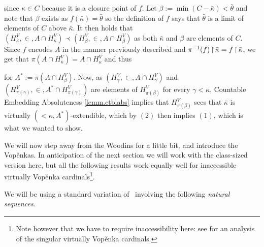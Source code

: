 \documentclass[../../main]{subfiles}
\begin{document}
{  since $\kappa\in C$ because it is a closure point of $f$. Let $\beta := \min(C-\bar\kappa) < \bar\theta$ and note that $\beta$ exists as $f(\bar\kappa)=\bar\theta$ so the definition of $f$ says that $\bar\theta$ is a limit of elements of $C$ above $\bar\kappa$. It then holds that $(H_{\bar\kappa}^V,\in,A\cap H_{\bar\kappa}^V) \prec (H_\beta^V,\in,A\cap H_\beta^V)$ as both $\bar\kappa$ and $\beta$ are elements of $C$. Since $f$ encodes $A$ in the manner previously described and $\pi^{-1}(f)\operatorname{\upharpoonright}\bar\kappa=f\operatorname{\upharpoonright}\bar\kappa$, we get that $\pi(A\cap H_{\bar\kappa}^V) = A\cap H_\kappa^V$ and thus

  for $A^* := \pi(A\cap H_\beta^V)$. Now, as $(H_\gamma^V,\in, A\cap H_\gamma^V)$ and $(H_{\pi(\gamma)}^V,\in,A^*\cap H_{\pi(\gamma)}^V)$ are elements of $H_{\pi(\beta)}^V$ for every $\gamma<\kappa$, Countable Embedding Absoluteness \ref{lemm.ctblabs} implies that $H_{\pi(\beta)}^V$ sees that $\bar\kappa$ is virtually $({<}\kappa, A^*)$-extendible, which by $(2)$ then implies $(1)$, which is what we wanted to show.
}


We will now step away from the Woodins for a little bit, and introduce the Vop\v enkas. In anticipation of the next section we will work with the class-sized version here, but all the following results work equally well for inaccessible virtually Vop\v enka cardinals\footnote{Note however that we have to require inaccessibility here: see \cite{WilsonVopenka} for an analysis of the singular virtually Vop\v enka cardinals.}.


We will be using a standard variation of \gvp\, involving the following \textit{natural sequences}.

\end{document}
